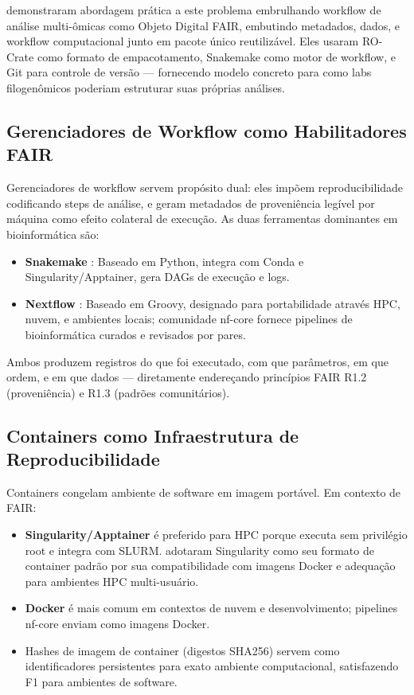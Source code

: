 \textcite{niehues2024} demonstraram abordagem prática a este problema embrulhando workflow de análise multi-ômicas como Objeto Digital FAIR, embutindo metadados, dados, e workflow computacional junto em pacote único reutilizável. Eles usaram RO-Crate como formato de empacotamento, Snakemake como motor de workflow, e Git para controle de versão --- fornecendo modelo concreto para como labs filogenômicos poderiam estruturar suas próprias análises.

\subsection{Gerenciadores de Workflow como Habilitadores FAIR}

Gerenciadores de workflow servem propósito dual: eles impõem reproducibilidade codificando steps de análise, e geram metadados de proveniência legível por máquina como efeito colateral de execução. As duas ferramentas dominantes em bioinformática são:

\begin{itemize}
\item \textbf{Snakemake} \parencite{molder2021}: Baseado em Python, integra com Conda e Singularity/Apptainer, gera DAGs de execução e logs.

\item \textbf{Nextflow} \parencite{di2017}: Baseado em Groovy, designado para portabilidade através HPC, nuvem, e ambientes locais; comunidade nf-core \parencite{ewels2020} fornece pipelines de bioinformática curados e revisados por pares.
\end{itemize}

Ambos produzem registros do que foi executado, com que parâmetros, em que ordem, e em que dados --- diretamente endereçando princípios FAIR R1.2 (proveniência) e R1.3 (padrões comunitários).

\subsection{Containers como Infraestrutura de Reproducibilidade}

Containers congelam ambiente de software em imagem portável. Em contexto de FAIR:

\begin{itemize}
\item \textbf{Singularity/Apptainer} é preferido para HPC porque executa sem privilégio root e integra com SLURM. \textcite{zafeiropoulos2021} adotaram Singularity como seu formato de container padrão por sua compatibilidade com imagens Docker e adequação para ambientes HPC multi-usuário.

\item \textbf{Docker} é mais comum em contextos de nuvem e desenvolvimento; pipelines nf-core enviam como imagens Docker.

\item Hashes de imagem de container (digestos SHA256) servem como identificadores persistentes para exato ambiente computacional, satisfazendo F1 para ambientes de software.
\end{itemize}

